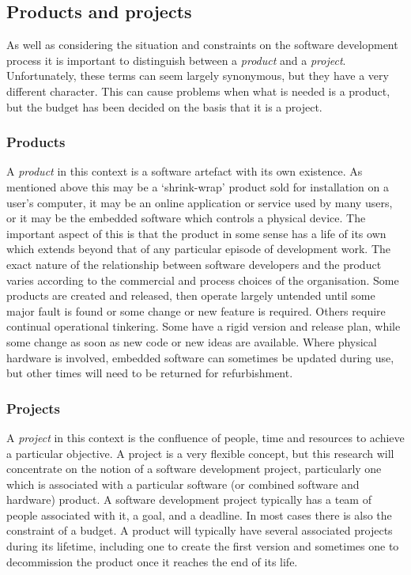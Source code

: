 \subsection{Products and projects}

As well as considering the situation and constraints on the software development process it is important to distinguish between a \emph{product} and a \emph{project}. Unfortunately, these terms can seem largely synonymous, but they have a very different character. This can cause problems when what is needed is a product, but the budget has been decided on the basis that it is a project.

\subsubsection{Products}

A \emph{product} in this context is a software artefact with its own existence. As mentioned above this may be a `shrink-wrap' product sold for installation on a user's computer, it may be an online application or service used by many users, or it may be the embedded software which controls a physical device. The important aspect of this is that the product in some sense has a life of its own which extends beyond that of any particular episode of development work. The exact nature of the relationship between software developers and the product varies according to the commercial and process choices of the organisation. Some products are created and released, then operate largely untended until some major fault is found or some change or new feature is required. Others require continual operational tinkering. Some have a rigid version and release plan, while some change as soon as new code or new ideas are available. Where physical hardware is involved, embedded software can sometimes be updated during use, but other times will need to be returned for refurbishment.

\subsubsection{Projects}

A \emph{project} in this context is the confluence of people, time and resources to achieve a particular objective. A project is a very flexible concept, but this research will concentrate on the notion of a software development project, particularly one which is associated with a particular software (or combined software and hardware) product. A software development project typically has a team of people associated with it, a goal, and a deadline. In most cases there is also the constraint of a budget. A product will typically have several associated projects during its lifetime, including one to create the first version and sometimes one to decommission the product once it reaches the end of its life.

